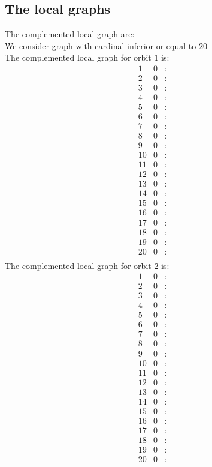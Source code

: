 \documentclass[12pt]{article}
\begin{document}
\subsection{The local graphs}
The complemented local graph are:\\
We consider graph with cardinal inferior or equal to $20$\\
The complemented local graph for orbit $1$ is:
\begin{equation*}
\begin{array}{rrcl}
1&0&:&\\
2&0&:&\\
3&0&:&\\
4&0&:&\\
5&0&:&\\
6&0&:&\\
7&0&:&\\
8&0&:&\\
9&0&:&\\
10&0&:&\\
11&0&:&\\
12&0&:&\\
13&0&:&\\
14&0&:&\\
15&0&:&\\
16&0&:&\\
17&0&:&\\
18&0&:&\\
19&0&:&\\
20&0&:&\\
\end{array}
\end{equation*}
The complemented local graph for orbit $2$ is:
\begin{equation*}
\begin{array}{rrcl}
1&0&:&\\
2&0&:&\\
3&0&:&\\
4&0&:&\\
5&0&:&\\
6&0&:&\\
7&0&:&\\
8&0&:&\\
9&0&:&\\
10&0&:&\\
11&0&:&\\
12&0&:&\\
13&0&:&\\
14&0&:&\\
15&0&:&\\
16&0&:&\\
17&0&:&\\
18&0&:&\\
19&0&:&\\
20&0&:&\\
\end{array}
\end{equation*}
\end{document}
